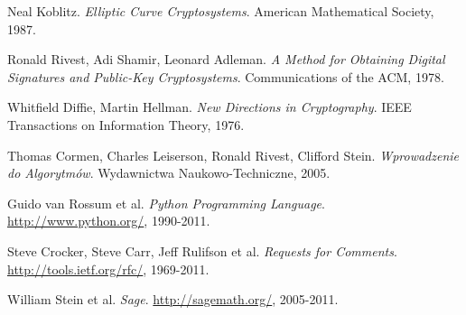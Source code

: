 \begin{thebibliography}{99}
    Neal Koblitz.
    \emph{Elliptic Curve Cryptosystems}.
    American Mathematical Society, 1987.

    Ronald Rivest, Adi Shamir, Leonard Adleman.
    \emph{A Method for Obtaining Digital Signatures
        and Public-Key Cryptosystems}.
    Communications of the ACM, 1978.

    Whitfield Diffie, Martin Hellman.
    \emph{New Directions in Cryptography}.
    IEEE Transactions on Information Theory, 1976.

    Thomas Cormen, Charles Leiserson, Ronald Rivest, Clifford Stein.
    \emph{Wprowadzenie do Algorytmów}.
    Wydawnictwa Naukowo-Techniczne, 2005.

    Guido van Rossum et al.
    \emph{Python Programming Language}.
    \url{http://www.python.org/}, 1990-2011.

    Steve Crocker, Steve Carr, Jeff Rulifson et al.
    \emph{Requests for Comments}.
    \url{http://tools.ietf.org/rfc/}, 1969-2011.

    William Stein et al.
    \emph{Sage}.
    \url{http://sagemath.org/}, 2005-2011.

\end{thebibliography}
